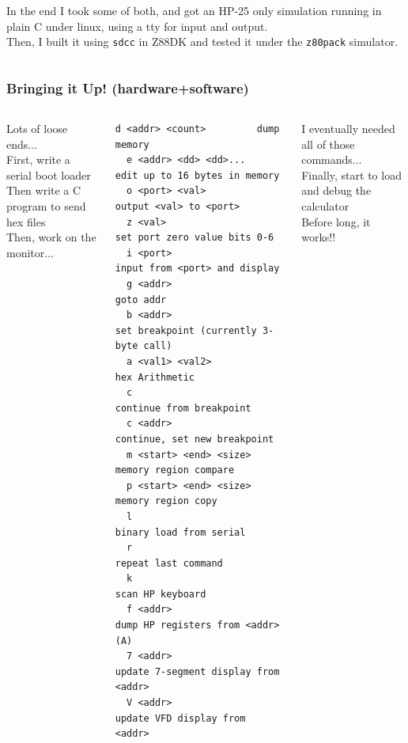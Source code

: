 \documentclass{beamer}
\newcommand{\tred}[1]{\textcolor{my-red}{#1}}
\newcommand{\tgreen}[1]{\textcolor{my-green}{#1}}
\newcommand{\tblue}[1]{\textcolor{my-blue}{#1}}
\newcommand{\tviolet}[1]{\textcolor{my-violet}{#1}}
\begin{document}
\begin{frame}
\begin{columns}
    \vskip 0.1in
    \tblue{In the end I took some of both, and got an HP-25 only
      simulation running in plain C under linux, using a tty
      for input and output.} \\

    \vskip 0.1in
    \tviolet{Then, I built it using {\tt sdcc} in Z88DK and tested
      it under the {\tt z80pack} simulator.}
  \end{columns}
\end{frame}

\begin{frame}[fragile]
  \frametitle{Bringing it Up!  (hardware+software)}

  \begin{columns}
  \scriptsize
  \vskip -0.2in
  \tgreen{Lots of loose ends...} \\
  \vskip 0.1in
  \tblue{First, write a serial boot loader} \\
  \vskip 0.1in
  \tblue{Then write a C program to send hex files} \\
  \vskip 0.1in
  \tblue{Then, work on the monitor...} \\
\begin{Verbatim}[fontsize=\tiny]
  d <addr> <count>         dump memory
  e <addr> <dd> <dd>...    edit up to 16 bytes in memory
  o <port> <val>           output <val> to <port>
  z <val>                  set port zero value bits 0-6
  i <port>                 input from <port> and display
  g <addr>                 goto addr
  b <addr>                 set breakpoint (currently 3-byte call)
  a <val1> <val2>          hex Arithmetic
  c                        continue from breakpoint
  c <addr>                 continue, set new breakpoint
  m <start> <end> <size>   memory region compare
  p <start> <end> <size>   memory region copy
  l                        binary load from serial
  r                        repeat last command
  k                        scan HP keyboard
  f <addr>                 dump HP registers from <addr> (A)
  7 <addr>                 update 7-segment display from <addr>
  V <addr>                 update VFD display from <addr>
\end{Verbatim}
  \tred{I eventually needed all of those commands...} \\
  \vskip 0.1in
  \tgreen{Finally, start to load and debug the calculator} \\
  \tgreen{Before long, it works!!}


\end{columns}
\end{frame}
\end{document}
